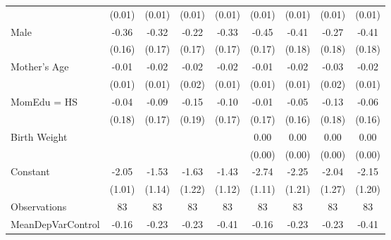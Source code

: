{\begin{tabular}{l*{8}{c}}
                    &      (0.01)         &      (0.01)         &      (0.01)         &      (0.01)         &      (0.01)         &      (0.01)         &      (0.01)         &      (0.01)         \\
[1em]
Male                &       -0.36\sym{**} &       -0.32\sym{*}  &       -0.22         &       -0.33\sym{*}  &       -0.45\sym{**} &       -0.41\sym{**} &       -0.27         &       -0.41\sym{**} \\
                    &      (0.16)         &      (0.17)         &      (0.17)         &      (0.17)         &      (0.17)         &      (0.18)         &      (0.18)         &      (0.18)         \\
[1em]
Mother's Age        &       -0.01         &       -0.02         &       -0.02         &       -0.02         &       -0.01         &       -0.02         &       -0.03         &       -0.02         \\
                    &      (0.01)         &      (0.01)         &      (0.02)         &      (0.01)         &      (0.01)         &      (0.01)         &      (0.02)         &      (0.01)         \\
[1em]
MomEdu = HS         &       -0.04         &       -0.09         &       -0.15         &       -0.10         &       -0.01         &       -0.05         &       -0.13         &       -0.06         \\
                    &      (0.18)         &      (0.17)         &      (0.19)         &      (0.17)         &      (0.17)         &      (0.16)         &      (0.18)         &      (0.16)         \\
[1em]
Birth Weight        &                     &                     &                     &                     &        0.00\sym{*}  &        0.00\sym{*}  &        0.00         &        0.00         \\
                    &                     &                     &                     &                     &      (0.00)         &      (0.00)         &      (0.00)         &      (0.00)         \\
[1em]
Constant            &       -2.05\sym{**} &       -1.53         &       -1.63         &       -1.43         &       -2.74\sym{**} &       -2.25\sym{*}  &       -2.04         &       -2.15\sym{*}  \\
                    &      (1.01)         &      (1.14)         &      (1.22)         &      (1.12)         &      (1.11)         &      (1.21)         &      (1.27)         &      (1.20)         \\
\hline
Observations        &          83         &          83         &          83         &          83         &          83         &          83         &          83         &          83         \\
MeanDepVarControl   &       -0.16         &       -0.23         &       -0.23         &       -0.41         &       -0.16         &       -0.23         &       -0.23         &       -0.41         \\
\hline\hline
\end{tabular}
}
